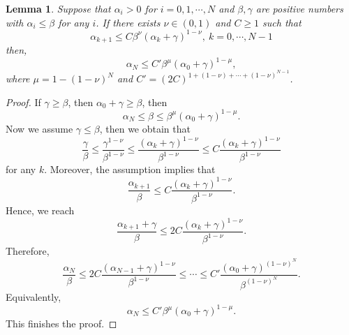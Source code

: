 \documentclass[12pt, reqno]{amsart}
\theoremstyle{plain}%
\newtheorem{lemma}[theorem]{Lemma}
\theoremstyle{definition}
\theoremstyle{remark}
\numberwithin{equation}{section}
\begin{document}
\begin{lemma}\label{lemma:iteratedInterpolation}
	Suppose that  $\alpha_i>0$ for $i=0,1,\cdots,N$ and $\beta,\gamma$ are positive numbers with $\alpha_i\leq \beta$ for any $i$. If there exists $\nu\in(0,1)$ and $C\geq 1$ such that 
	$$\alpha_{k+1}\leq C\beta^\nu(\alpha_{k}+\gamma)^{1-\nu},\ k = 0, \cdots, N-1$$
	 then,
	$$\alpha_N\leq C'\beta^\mu(\alpha_{0}+\gamma)^{1-\mu},$$
	where $\mu=1-(1-\nu)^N$ and $C'=(2C)^{1+(1-\nu)+\cdots+(1-\nu)^{N-1}}$.
\end{lemma}
\begin{proof}
	If $\gamma\geq\beta$, then $\alpha_0+\gamma\geq\beta$, then
	$$\alpha_N\leq \beta\leq\beta^\mu(\alpha_0+\gamma)^{1-\mu}.$$
	Now we assume $\gamma\leq \beta$, then we obtain that
	$$\frac{\gamma}{\beta}\leq \frac{\gamma^{1-\nu}}{\beta^{1-\nu}}\leq \frac{(\alpha_k+\gamma)^{1-\nu}}{\beta^{1-\nu}}\leq C\frac{(\alpha_k+\gamma)^{1-\nu}}{\beta^{1-\nu}}$$
	for any $k$.  Moreover, the assumption implies that
	$$\frac{\alpha_{k+1}}{\beta}\leq C\frac{(\alpha_k+\gamma)^{1-\nu}}{\beta^{1-\nu}}.$$
	Hence, we reach
	$$\frac{\alpha_{k+1}+\gamma}{\beta}\leq 2 C\frac{(\alpha_k+\gamma)^{1-\nu}}{\beta^{1-\nu}}.$$
	Therefore,
	$$\frac{\alpha_N}{\beta}\leq 2C\frac{(\alpha_{N-1}+\gamma)^{1-\nu}}{\beta^{1-\nu}}\leq \cdots\leq C'\frac{(\alpha_0+\gamma)^{(1-\nu)^N}}{\beta^{(1-\nu)^N}}.$$
	Equivalently,
	$$\alpha_N\leq C' \beta^\mu(\alpha_0+\gamma)^{1-\mu}.$$
	This finishes the proof.	
\end{proof}
\end{document}
